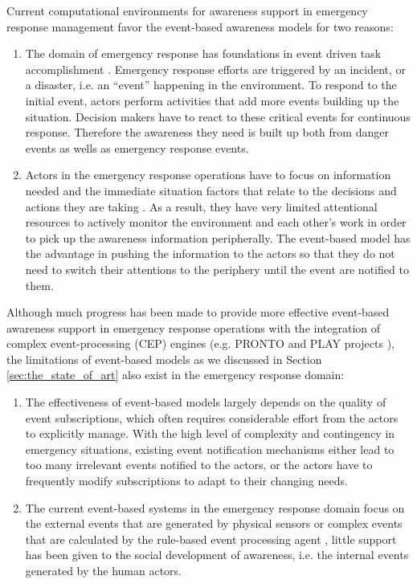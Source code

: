 Current computational environments for awareness support in emergency response management favor the event-based awareness models for two reasons:

\begin{enumerate}
	\item The domain of emergency response has foundations in event driven task accomplishment \cite{Pottebaum2011}. Emergency response efforts are triggered by an incident, or a disaster, i.e. an ``event'' happening in the environment. To respond to the initial event, actors perform activities that add more events building up the situation. Decision makers have to react to these critical events for continuous response. Therefore the awareness they need is built up both from danger events as wells as emergency response events.
	\item Actors in the emergency response operations have to focus on information needed and the immediate situation factors that relate to the decisions and actions they are taking \cite{Turoff2004}. As a result, they have very limited attentional resources to actively monitor the environment and each other's work in order to pick up the awareness information peripherally. The event-based model has the advantage in pushing the information to the actors so that they do not need to switch their attentions to the periphery until the event are notified to them.
\end{enumerate}

Although much progress has been made to provide more effective event-based awareness support in emergency response operations with the integration of complex event-processing (CEP) engines (e.g. PRONTO \cite{Pottebaum2011} and PLAY projects \cite{Truptil2012}), the limitations of event-based models as we discussed in Section \ref{sec:the_state_of_art} also exist in the emergency response domain: 

\begin{enumerate}
	\item The effectiveness of event-based models largely depends on the quality of event subscriptions, which often requires considerable effort from the actors to explicitly manage. With the high level of complexity and contingency in emergency situations, existing event notification mechanisms either lead to too many irrelevant events notified to the actors, or the actors have to frequently modify subscriptions to adapt to their changing needs.
	\item The current event-based systems in the emergency response domain focus on the external events that are generated by physical sensors or complex events that are calculated by the rule-based event processing agent \cite{Pottebaum2011}, little support has been given to the social development of awareness, i.e. the internal events generated by the human actors.
\end{enumerate}

